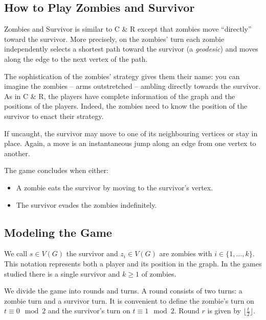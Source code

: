 \subsection{How to Play Zombies and Survivor}

Zombies and Survivor is similar to C \& R except that zombies move
``directly'' toward the survivor. More precisely, on the zombies' turn
each zombie independently selects a shortest path toward the survivor (a \textit{geodesic})
and moves along the edge to the next vertex of the path.

The sophistication of the zombies' strategy gives them their name:
you can imagine the zombies -- arms outstretched -- ambling directly towards the survivor.
As in C \& R, the players have complete information of the graph and the positions of the players. Indeed, the zombies need to know the position of the survivor to enact
their strategy.

If uncaught, the survivor may move to one of its neighbouring vertices or stay in place.
 Again, a move is an instantaneous jump along an edge from one vertex to another.

The game concludes when either:
\begin{itemize}
\item A zombie eats the survivor by moving to the survivor's vertex.
\item The survivor evades the zombies indefinitely.
\end{itemize}



\subsection{Modeling the Game}

We call $s \in V(G)$ the survivor and $z_i \in V(G)$ are zombies with $i \in \{1, \dots, k\}$.
This notation represents both a player and its position in the graph.
In the games studied there is a single survivor and $k \geq 1$ of zombies.


We divide the game into rounds and turns. A round consists of two turns:
a zombie turn and a survivor turn.
It is convenient to define the zombie's turn on $t \equiv 0 \mod{2}$ and the survivor's turn on $t \equiv 1 \mod{2}$.
Round $r$ is given by $\lfloor \frac{t}{2} \rfloor$.

